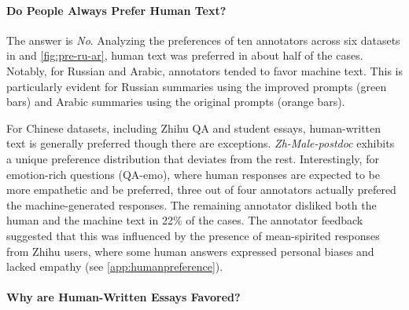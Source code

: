 \paragraph{Do People Always Prefer Human Text?}
The answer is \emph{No}.
Analyzing the preferences of ten annotators across six datasets in  and \ref{fig:pre-ru-ar}, human text was preferred in about half of the cases. Notably, for Russian and Arabic, annotators tended to favor machine text. 
This is particularly evident for Russian summaries using the improved prompts (green bars) and Arabic summaries using the original prompts (orange bars).


For Chinese datasets, including Zhihu QA and student essays, human-written text is generally preferred though there are exceptions.
\textit{Zh-Male-postdoc} exhibits a unique preference distribution that deviates from the rest.
Interestingly, for emotion-rich questions (QA-emo), where human responses are expected to be more empathetic and be preferred, three out of four annotators actually prefered the machine-generated responses. The remaining annotator disliked both the human and the machine text in 22\% of the cases. The annotator feedback suggested that this was influenced by the presence of mean-spirited responses from Zhihu users, where some human answers expressed personal biases and lacked empathy (see \ref{app:humanpreference}).


\paragraph{Why are Human-Written Essays Favored?}

